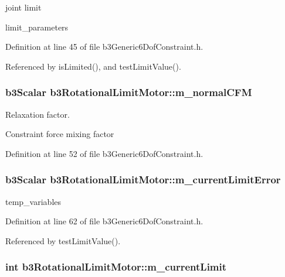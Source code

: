 joint limit 

limit\_\-parameters 

Definition at line 45 of file b3Generic6DofConstraint.h.

Referenced by isLimited(), and testLimitValue().\hypertarget{classb3_rotational_limit_motor_bf008f6f2ecc5a97eed73825db97678e}{
\subsubsection[m\_\-normalCFM]{\setlength{\rightskip}{0pt plus 5cm}b3Scalar {\bf b3RotationalLimitMotor::m\_\-normalCFM}}}
\label{classb3_rotational_limit_motor_bf008f6f2ecc5a97eed73825db97678e}


Relaxation factor. 

Constraint force mixing factor 

Definition at line 52 of file b3Generic6DofConstraint.h.\hypertarget{classb3_rotational_limit_motor_63167fcd92370cd81b058b9013aa2342}{
\subsubsection[m\_\-currentLimitError]{\setlength{\rightskip}{0pt plus 5cm}b3Scalar {\bf b3RotationalLimitMotor::m\_\-currentLimitError}}}
\label{classb3_rotational_limit_motor_63167fcd92370cd81b058b9013aa2342}


temp\_\-variables 

Definition at line 62 of file b3Generic6DofConstraint.h.

Referenced by testLimitValue().\hypertarget{classb3_rotational_limit_motor_04210dff8941deee039e6c290a50f301}{
\subsubsection[m\_\-currentLimit]{\setlength{\rightskip}{0pt plus 5cm}int {\bf b3RotationalLimitMotor::m\_\-currentLimit}}}
\label{classb3_rotational_limit_motor_04210dff8941deee039e6c290a50f301}


